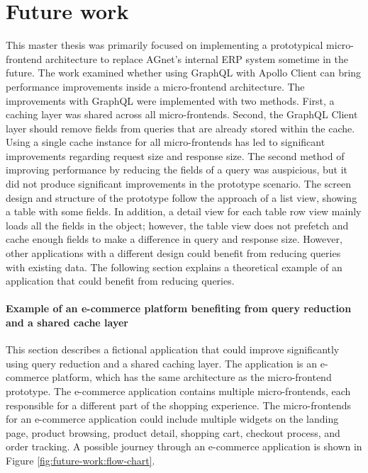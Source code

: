\chapter{Future work}\label{chapter:future-work}

This master thesis was primarily focused on implementing a prototypical micro-frontend architecture to replace AGnet's internal \ac{ERP} system sometime in the future. The work examined whether using GraphQL with Apollo Client can bring performance improvements inside a micro-frontend architecture. The improvements with GraphQL were implemented with two methods. First, a caching layer was shared across all micro-frontends. Second, the GraphQL Client layer should remove fields from queries that are already stored within the cache. Using a single cache instance for all micro-frontends has led to significant improvements regarding request size and response size. The second method of improving performance by reducing the fields of a query was auspicious, but it did not produce significant improvements in the prototype scenario. The screen design and structure of the prototype follow the approach of a list view, showing a table with some fields. In addition, a detail view for each table row view mainly loads all the fields in the object; however, the table view does not prefetch and cache enough fields to make a difference in query and response size. However, other applications with a different design could benefit from reducing queries with existing data. The following section explains a theoretical example of an application that could benefit from reducing queries.

\subsubsection{Example of an e-commerce platform benefiting from query reduction and a shared cache layer}

This section describes a fictional application that could improve significantly using query reduction and a shared caching layer. The application is an e-commerce platform, which has the same architecture as the micro-frontend prototype. The e-commerce application contains multiple micro-frontends, each responsible for a different part of the shopping experience. The micro-frontends for an e-commerce application could include multiple widgets on the landing page, product browsing, product detail, shopping cart, checkout process, and order tracking. A possible journey through an e-commerce application is shown in Figure \ref{fig:future-work:flow-chart}.

